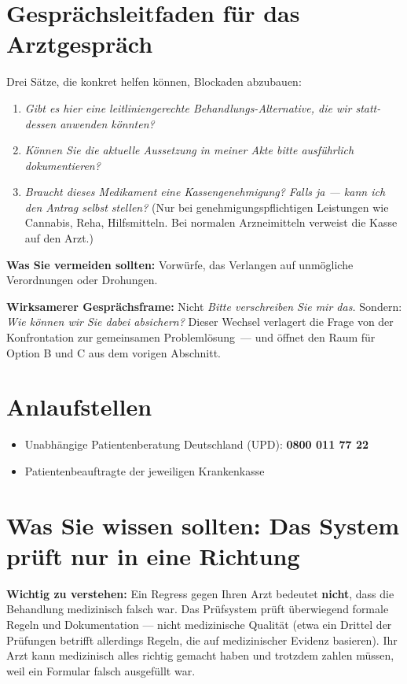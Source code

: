 \documentclass[a4paper]{umbruch-position}
\begin{document}
\section{Gespr\"achsleitfaden f\"ur das Arztgespr\"ach}

Drei S\"atze, die konkret helfen k\"onnen, Blockaden abzubauen:
\begin{enumerate}
    \item \textit{\glqq{}Gibt es hier eine leitliniengerechte Behandlungs-Alternative, die wir statt-dessen anwenden k\"onnten?\grqq{}}
    \item \textit{\glqq{}K\"onnen Sie die aktuelle Aussetzung in meiner Akte bitte ausf\"uhrlich dokumentieren?\grqq{}}
    \item \textit{\glqq{}Braucht dieses Medikament eine Kassengenehmigung? Falls ja --- kann ich den Antrag selbst stellen?\grqq{}} (Nur bei genehmigungspflichtigen Leistungen wie Cannabis, Reha, Hilfsmitteln. Bei normalen Arzneimitteln verweist die Kasse auf den Arzt.)
\end{enumerate}
\textbf{Was Sie vermeiden sollten:} Vorw\"urfe, das Verlangen auf unm\"ogliche Verordnungen oder Drohungen.

\medskip
\textbf{Wirksamerer Gespr\"achsframe:} Nicht \textit{\glqq{}Bitte verschreiben Sie mir das.\grqq{}} Sondern: \textit{\glqq{}Wie k\"onnen wir Sie dabei absichern?\grqq{}} Dieser Wechsel verlagert die Frage von der Konfrontation zur gemeinsamen Probleml\"osung~--- und \"offnet den Raum f\"ur Option B und C aus dem vorigen Abschnitt.

\section{Anlaufstellen}
\begin{itemize}
    \item Unabh\"angige Patientenberatung Deutschland (UPD): \textbf{0800 011 77 22}
    \item Patientenbeauftragte der jeweiligen Krankenkasse
\end{itemize}

\section{Was Sie wissen sollten: Das System pr\"uft nur in eine Richtung}

\begin{infobox}
\textbf{Wichtig zu verstehen:} Ein Regress gegen Ihren Arzt bedeutet \textbf{nicht}, dass die Behandlung medizinisch falsch war. Das Pr\"ufsystem pr\"uft \"uberwiegend formale Regeln und Dokumentation --- nicht medizinische Qualit\"at (etwa ein Drittel der Pr\"ufungen betrifft allerdings Regeln, die auf medizinischer Evidenz basieren). Ihr Arzt kann medizinisch alles richtig gemacht haben und trotzdem zahlen m\"ussen, weil ein Formular falsch ausgef\"ullt war.
\end{infobox}
\end{document}
